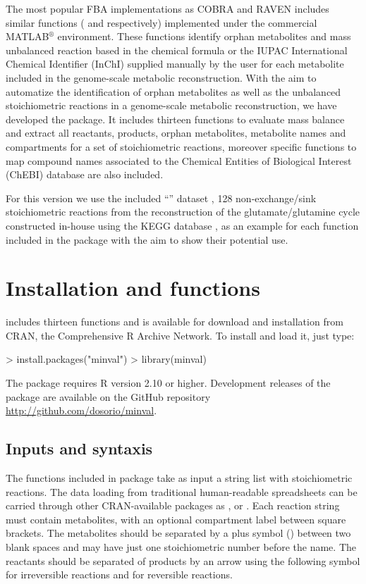 The most popular FBA implementations as COBRA and RAVEN includes similar functions ( and  respectively) implemented under the commercial MATLAB$^{\circledR}$ environment. These functions identify orphan metabolites and mass unbalanced reaction based in the chemical formula or the IUPAC International Chemical Identifier (InChI) supplied manually by the user for each metabolite included in the genome-scale metabolic reconstruction. With the aim to automatize the identification of orphan metabolites as well as the unbalanced stoichiometric reactions in a genome-scale metabolic reconstruction, we have developed the  package. It includes thirteen functions to evaluate mass balance and extract all reactants, products, orphan metabolites, metabolite names and compartments for a set of stoichiometric reactions, moreover specific functions to map compound names associated to the Chemical Entities of Biological Interest (ChEBI) database are also included.

For this version we use the included ``'' dataset \citep{NelsonE.2015}, 128 non-exchange/sink stoichiometric reactions from the reconstruction of the glutamate/glutamine cycle constructed in-house using the KEGG database , as an example for each function included in the  package with the aim to show their potential use.



\section{Installation and functions}
 includes thirteen functions and is available for download and installation from CRAN, the
Comprehensive R Archive Network. To install and load it, just type:
\begin{Schunk}
\begin{Sinput}
> install.packages("minval")
> library(minval)
\end{Sinput}
\end{Schunk}
The  package requires R version 2.10 or higher. Development releases of the package are available on the GitHub repository \url{http://github.com/dosorio/minval}.
\subsection{Inputs and syntaxis}
The functions included in  package take as input a string list with stoichiometric reactions. The data loading from traditional human-readable spreadsheets can be carried through other CRAN-available packages as ,  or . Each reaction string must contain metabolites, with an optional compartment label between square brackets. The metabolites should be separated by a plus symbol (\code{+}) between two blank spaces and may have just one stoichiometric number before the name. The reactants should be separated of products by an arrow using the following symbol \code{=>} for irreversible reactions and \code{<=>} for reversible reactions.

